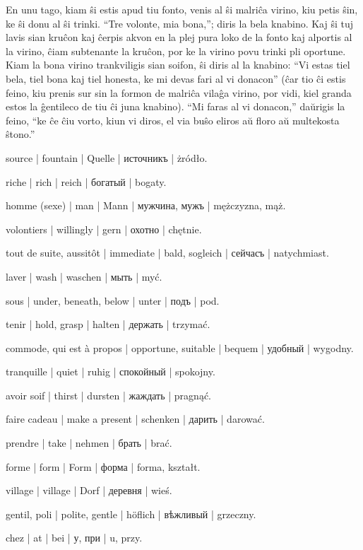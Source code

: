 En unu tago, kiam ŝi estis apud tiu fonto, venis al ŝi malriĉa virino, kiu petis ŝin, ke ŝi donu al ŝi trinki. “Tre volonte, mia bona,”; diris la bela knabino. Kaj ŝi tuj lavis sian kruĉon kaj ĉerpis akvon en la plej pura loko de la fonto kaj alportis al la virino, ĉiam subtenante la kruĉon, por ke la virino povu trinki pli oportune. Kiam la bona virino trankviligis sian soifon, ŝi diris al la knabino: “Vi estas tiel bela, tiel bona kaj tiel honesta, ke mi devas fari al vi donacon” (ĉar tio ĉi estis feino, kiu prenis sur sin la formon de malriĉa vilaĝa virino, por vidi, kiel granda estos la ĝentileco de tiu ĉi juna knabino). “Mi faras al vi donacon,” daŭrigis la feino, “ke ĉe ĉiu vorto, kiun vi diros, el via buŝo eliros aŭ floro aŭ multekosta ŝtono.”

\begin{ekzvocab}{1em}
 source | fountain | Quelle | источникъ | żródło.

 riche | rich | reich | богатый | bogaty.

 homme (sexe) | man | Mann | мужчина, мужъ | mężczyzna, mąż.

 volontiers | willingly | gern | охотно | chętnie.

 tout de suite, aussitôt | immediate | bald, sogleich | сейчасъ | natychmiast.

 laver | wash | waschen | мыть | myć.

 sous | under, beneath, below | unter | подъ | pod.

 tenir | hold, grasp | halten | держать | trzymać.

 commode, qui est à propos | opportune, suitable | bequem | удобный | wygodny.

 tranquille | quiet | ruhig | спокойный | spokojny.

 avoir soif | thirst | dursten | жаждать | pragnąć.

 faire cadeau | make a present | schenken | дарить | darować.

 prendre | take | nehmen | брать | brać.

 forme | form | Form | форма | forma, kształt.

 village | village | Dorf | деревня | wieś.

 gentil, poli | polite, gentle | höflich | вѣжливый | grzeczny.

 chez | at | bei | у, при | u, przy.

\end{ekzvocab}


